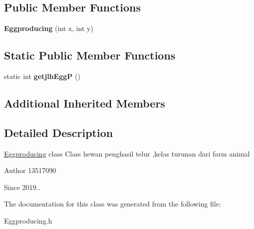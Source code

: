 \subsection*{Public Member Functions}
\begin{DoxyCompactItemize}
\item 
\mbox{\label{classEggproducing_a61b4dcb66766bd42d50b965c7e1e4b82}} 
{\bfseries Eggproducing} (int x, int y)
\end{DoxyCompactItemize}
\subsection*{Static Public Member Functions}
\begin{DoxyCompactItemize}
\item 
\mbox{\label{classEggproducing_abab358d9eec12cca84e962f4e665afb8}} 
static int {\bfseries getjlh\+EggP} ()
\end{DoxyCompactItemize}
\subsection*{Additional Inherited Members}


\subsection{Detailed Description}
\hyperlink{classEggproducing}{Eggproducing} class Class hewan penghasil telur ,kelas turunan dari farm animal \begin{DoxyAuthor}{Author}
13517090 
\end{DoxyAuthor}
\begin{DoxySince}{Since}
2019.. 
\end{DoxySince}


The documentation for this class was generated from the following file\+:\begin{DoxyCompactItemize}
\item 
Eggproducing.\+h\end{DoxyCompactItemize}

